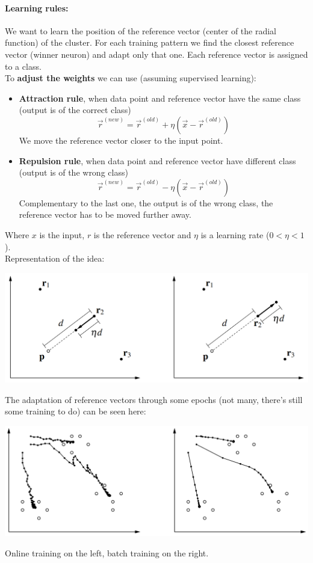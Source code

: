 \paragraph{Learning rules:} We want to learn the position of the reference vector (center of the radial function) of the cluster. For each training pattern we find the closest reference vector (winner neuron) and adapt only that one. Each reference vector is assigned to a class.\\

To \textbf{adjust the weights} we can use (assuming supervised learning):
\begin{itemize}
	\item \textbf{Attraction rule}, when data point and reference vector have the same class (output is of the correct class)
	$$ \vec{r}^{(new)} = \vec{r}^{(old)} + \eta \left(\vec{x} - \vec{r}^{(old)}\right)$$
	We move the reference vector closer to the input point.\\
	
	\item \textbf{Repulsion rule}, when data point and reference vector have different class (output is of the wrong class)
	$$ \vec{r}^{(new)} = \vec{r}^{(old)} - \eta \left(\vec{x} - \vec{r}^{(old)}\right)$$
	Complementary to the last one, the output is of the wrong class, the reference vector has to be moved further away.\\
\end{itemize}

Where $x$ is the input, $r$ is the reference vector and $\eta$ is a learning rate ($0 < \eta < 1$).\\

Representation of the idea:
\begin{center}
	\includegraphics[width=0.9\columnwidth]{img/NN/LVQ1}
\end{center}

\newpage

The adaptation of reference vectors through some epochs (not many, there's still some training to do) can be seen here:
\begin{center}
	\includegraphics[width=0.9\columnwidth]{img/NN/LVQ2}
\end{center}
Online training on the left, batch training on the right.\\


